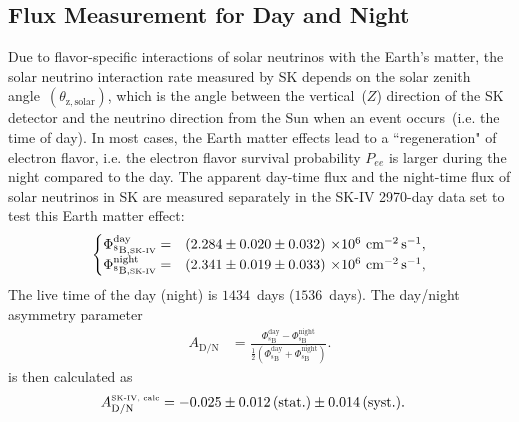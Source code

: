 \documentclass[aps,prd,reprint,superscriptaddress,floatfix,altaffilletter,nofootinbib]{revtex4-2}
\begin{document}
\subsection{Flux Measurement for Day and Night} \label{sec_dn}


Due to flavor-specific interactions of solar neutrinos with the Earth's matter, the solar neutrino interaction rate measured by SK depends on the solar zenith angle~$(\theta_{\mathrm{z,solar}})$, which is the angle between the vertical~($Z$) direction of the SK detector 
and the neutrino direction from the Sun when an event occurs~(i.e. the time of day). In most cases, the Earth matter effects lead to a ``regeneration" of electron flavor, i.e. the electron flavor survival probability $P_{ee}$ is larger during the night compared to the day.
The apparent day-time flux and the night-time flux of solar neutrinos in SK are measured separately in the SK-IV 2970-day data set to test this Earth matter effect:
\begin{equation*}
    \begin{cases}
        \Phi_{\mathrm{^{8}B},\mbox{\tiny SK-IV}}^{\mathrm{day}}  = & (2.284\pm0.020\pm0.032)~\mathrm{\times10^{6}~cm^{-2}\,s^{-1}}, \\
        \Phi_{\mathrm{^{8}B},\mbox{\tiny SK-IV}}^{\mathrm{night}}  = &  (2.341\pm0.019\pm0.033)~\mathrm{\times10^{6}~cm^{-2}\,s^{-1}},
    \end{cases}
\end{equation*}
The live time of the day (night) is $1434$~days ($1536$~days).
The day/night asymmetry parameter
\begin{align}
    A_{\mathrm{D/N}}  & =  \frac{\Phi_{\mathrm{^{8}B}}^{\mathrm{day}}-\Phi_{\mathrm{^{8}B}}^{\mathrm{night}}}{\frac{1}{2}(\Phi_{\mathrm{^{8}B}}^{\mathrm{day}}+\Phi_{\mathrm{^{8}B}}^{\mathrm{night}})}. 
    \label{eq:day-night}
\end{align}
is then calculated as
\begin{align}
    A_{\mathrm{D/N}}^{\mbox{\tiny SK-IV, calc}} 
& = -0.025\pm0.012\,(\mathrm{stat.})\pm0.014\,(\mathrm{syst.}).
\end{align}
\end{document}
